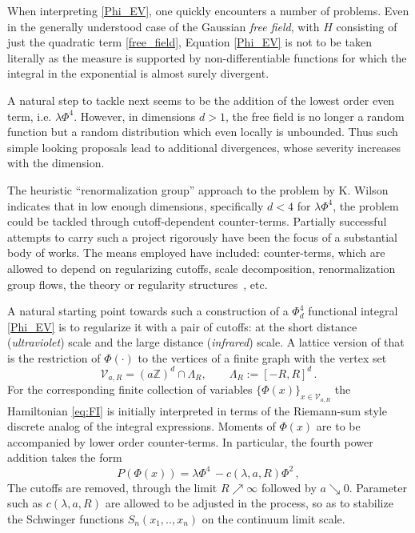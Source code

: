 \documentclass[a4paper,oneside,11pt]{article}
\def\Z{\mathbb{Z}}                          %
\newcommand{\be}[1]{\begin{equation}\label{#1}}
\newcommand{\ee}{\end{equation}}
\numberwithin{equation}{section}
\numberwithin{equation}{section}
\numberwithin{equation}{section}
\def\Z{\mathbb{Z}}                          %
\def\be{\begin{equation}}
\def\ee{\end{equation}}
\begin{document}
When interpreting   \eqref{Phi_EV}, one quickly encounters  a  number of problems.    Even in the generally understood case of the Gaussian \emph{free field},  with   $H$ consisting of just the quadratic term \eqref{free_field},  Equation \eqref{Phi_EV} is not to be taken  literally as   the measure is supported by non-differentiable functions for which the integral in the exponential is almost surely divergent.  

A natural step to tackle next seems to be the addition of  the lowest order even term, i.e. $\lambda \Phi^4$.   
However, in dimensions $d>1$, the free field is no longer a random function but a random distribution which even locally is unbounded.  Thus such simple looking proposals lead to additional divergences, whose severity increases with the dimension.  

The heuristic ``renormalization group'' approach to the problem  by K. Wilson~\cite{Wil71} indicates that in low enough dimensions, specifically $d<4$ for $\lambda \Phi^4$,  the problem could be tackled through cutoff-dependent counter-terms.  Partially successful attempts to carry such a project rigorously have been the focus of a substantial body of works.    The means employed have included: counter-terms, which are allowed to depend on regularizing cutoffs, scale decomposition, renormalization group flows, the theory or regularity structures~\cite{Hai14}, etc.  

A natural starting point towards such a construction of  a  $\Phi^4_d$  functional integral \eqref{Phi_EV} is to  regularize it with a pair of cutoffs: at the short distance (\emph{ultraviolet}) scale and the large distance (\emph{infrared}) scale.    A lattice version of that is the  restriction of  $\Phi(\cdot)$ to  the vertices of a finite graph with the vertex set 
\be \label{eq:a_R} 
\mathcal V_{a,R} = (a \Z)^d \cap \Lambda_R,  \qquad \Lambda_R :=[-R,R]^d\,.
\ee 
For the corresponding finite collection of variables $\{\Phi(x)\}_{x\in \mathcal V_{a,R}}$ the Hamiltonian \eqref{eq:FI} is initially interpreted in terms of the  Riemann-sum style discrete analog of the integral expressions.  Moments of $\Phi(x)$ are to be accompanied by lower order counter-terms.  In particular,  the fourth power addition takes the form
\be
 P(\Phi(x)) =\lambda \Phi^4\,-c(\lambda,a,R)\Phi^2 \,, 
\ee
The cutoffs are removed, through the limit   $R\nearrow \infty$ 
followed by $a\searrow 0$.  Parameter such as  $c(\lambda,a,R)$ are allowed to be adjusted in the process, so as to stabilize the Schwinger functions $S_n(x_1,.., x_n)$ on the continuum limit scale. 
\end{document}
